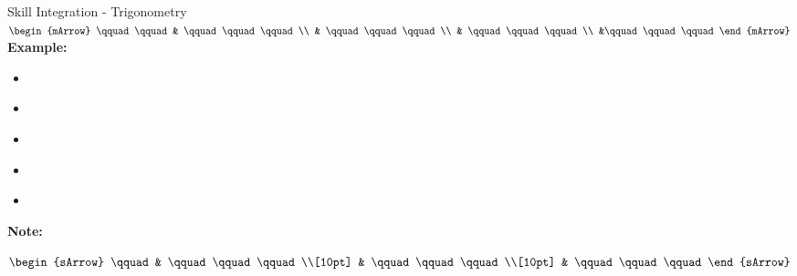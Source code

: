 \clearpage
{}
\begin{boxSkill}{Skill \thenskill \quad Integration - Trigonometry}
    \noindent%
	 $\begin{mArrow}
        \qquad \qquad &    \qquad\qquad\qquad          \\
                      & \qquad\qquad\qquad \\
			          & \qquad\qquad\qquad  \\
			          &\qquad\qquad\qquad
 	 \end{mArrow}$\\[0.5cm]
	 

	\textbf{Example:}
	\begin{itemize}[leftmargin=0.8cm]
	     \item[] $\qquad\qquad\qquad    $
	     \item[] $\qquad\qquad\qquad     $
	     \item[] $\qquad\qquad\qquad      $ 
	     \item[] $\qquad\qquad\qquad    $
	     \item[] $\qquad\qquad\qquad  $	 
	\end{itemize}
	
	\tcbline
	
    \textbf{Note:}\\[0.6cm]
	\begin{warningEnv}
	    $\begin{sArrow}
	        \qquad   & \qquad\qquad\qquad \\[10pt]
	  	             & \qquad\qquad\qquad                                                                        \\[10pt] 
                     & \qquad\qquad\qquad 				   
		 \end{sArrow}$		   
    \end{warningEnv}
\end{boxSkill}

